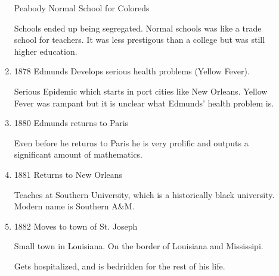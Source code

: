 \documentclass{report}
\begin{document}
\begin{description}
\begin{mdframed}
\begin{enumerate}
\begin{mdframed}
                        Peabody Normal School for Coloreds
                    \end{mdframed}
                    \begin{mdframed}
                        Schools ended up being segregated.
                        Normal schools was like a trade school
                        for teachers. It was less prestigous
                        than a college but was still
                        higher education.
                    \end{mdframed}
                \item 1878 Edmunds Develops serious health
                    problems (Yellow Fever).
                    \begin{mdframed}
                        Serious Epidemic which starts
                        in port cities like New Orleans.
                        Yellow Fever was rampant but
                        it is unclear what Edmunds' health
                        problem is.
                    \end{mdframed}
                \item 1880 Edmunds returns to Paris
                    \begin{mdframed}
                        Even before he returns to Paris he
                        is very prolific and outputs a
                        significant amount of mathematics.
                    \end{mdframed}
                \item 1881 Returns to New Orleans
                    \begin{mdframed}
                        Teaches at Southern University,
                        which is a historically black
                        university. Modern name is Southern
                        A\&M.
                    \end{mdframed}
                \item 1882 Moves to town of St. Joseph
                    \begin{mdframed}
                        Small town in Louisiana.
                        On the border of Louisiana and
                        Mississipi.
                    \end{mdframed}
                    \begin{mdframed}
                        Gets hospitalized, and is
                        bedridden for the rest of his life.
                    \end{mdframed}

\end{enumerate}
\end{mdframed}
\end{description}
\end{document}
